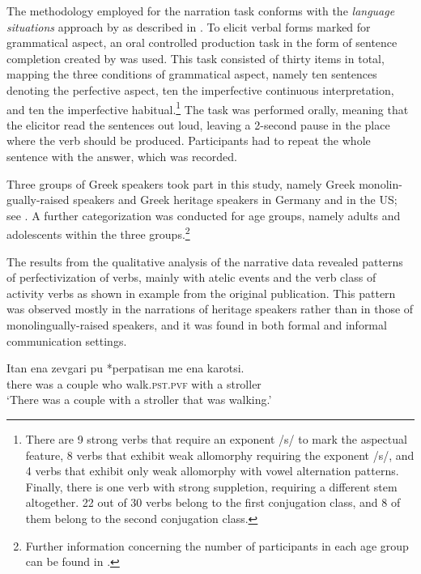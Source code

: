 \documentclass[output=paper,colorlinks,citecolor=brown]{langscibook}
\begin{document}
The methodology employed for the narration task conforms with the \textit{language situations} approach by \textcite{wiese2020language}  as described in .  To elicit verbal forms marked for grammatical aspect, an oral controlled production task in the form of sentence completion created by \textcite{agathopoulou2009morphological} was used. This task consisted of thirty items in total, mapping the three conditions of grammatical aspect, namely ten sentences denoting the perfective aspect, ten the imperfective continuous interpretation, and ten the imperfective habitual.\footnote{There are 9 strong verbs that require an exponent /s/ to mark the aspectual feature, 8 verbs that exhibit weak allomorphy requiring the exponent /s/, and  4 verbs that exhibit only weak allomorphy with vowel alternation patterns. Finally, there is one verb with strong suppletion, requiring a different stem altogether. 22 out of 30 verbs belong to the first conjugation class, and 8 of them belong to the second conjugation class.} The task was performed orally, meaning that the elicitor read the sentences out loud, leaving a 2-second pause in the place where the verb should be produced. Participants had to repeat the whole sentence with the answer, which was recorded.

Three groups of Greek speakers took part in this study, namely Greek monolin-gually-raised speakers and Greek heritage speakers in Germany and in the US; see . A further categorization was conducted for age groups, namely adults and adolescents within the three groups.\footnote{Further information concerning the number of participants in each age group can be found in \textcite[41--42]{rizou2021verbal}.}  

The results from the qualitative analysis of the narrative data revealed patterns of perfectivization of verbs, mainly with atelic events and the verb class of activity verbs as shown in example  from the original publication.
This pattern was observed mostly in the narrations of heritage speakers rather than in those of monolingually-raised speakers, and it was found in both formal and informal communication settings. 

\ea \label{perfectictivization_perpatisan}
\gll Itan ena zevgari pu *perpatisan me ena karotsi. \\ 
	{there was} a couple who \hphantom{*}walk.\textsc{pst.pvf} with a stroller \\
\glt `There was a couple with a stroller that was walking.' 
\z 
{}
\end{document}
